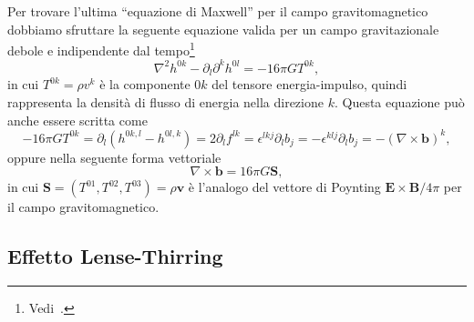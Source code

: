 Per trovare l'ultima ``equazione di Maxwell'' per il campo gravitomagnetico
dobbiamo sfruttare la seguente equazione valida per un campo gravitazionale
debole e indipendente dal
tempo\footnote{Vedi~\textcite[139]{ohanian:gravitazione}.}
\begin{equation}
  \nabla^{2}h^{0k} - \partial_{l}\partial^{k} h^{0l} = -16\pi GT^{0k},
\end{equation}
in cui $T^{0k} = \rho v^{k}$ è la componente $0k$ del tensore energia-impulso,
quindi rappresenta la densità di flusso di energia nella direzione $k$.  Questa
equazione può anche essere scritta come
\begin{equation}
  -16\pi GT^{0k} = \partial_{l}(h^{0k,l} - h^{0l,k}) = 2\partial_{l}f^{lk} =
  \epsilon^{lkj}\partial_{l}b_{j} = -\epsilon^{klj}\partial_{l}b_{j} = -(\nabla
  \times \bm{b})^{k},
\end{equation}
oppure nella seguente forma vettoriale
\begin{equation}
  \nabla \times \bm{b} = 16\pi G \bm{S},
\end{equation}
in cui $\bm{S} = (T^{01}, T^{02}, T^{03}) = \rho \bm{v}$ è l'analogo del
vettore di Poynting $\bm{E}\times\bm{B}/4\pi$ per il
campo gravitomagnetico.

\subsection{Effetto Lense-Thirring}
\label{sec:effetto-lense-thirring}


